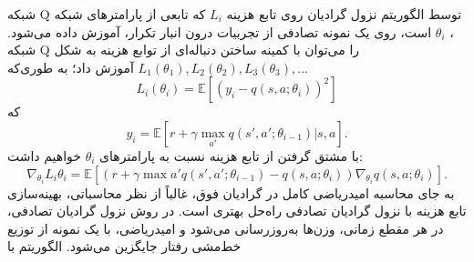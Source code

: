  شبکه Q توسط الگوریتم نزول گرادیان روی تابع هزینه 
$L_i$
که تابعی از پارامترهای شبکه 
،
$\theta_i$
 است، روی یک نمونه تصادفی از تجربیات درون انبار تکرار، آموزش داده می‌شود.
شبکه Q را می‌توان با کمینه ساختن دنباله‌ای از توابع هزینه به شکل 
$L_1(\theta_1), L_2(\theta_2), L_3(\theta_3), ... $ آموزش داد؛ به طوری‌که
$$L_i(\theta_i)=\mathbb{E}\left[(y_i - q(s,a;\theta_i))^2\right]$$  که  $$y_i = \mathbb{E}[r + \gamma \max_{a'} q(s',a'; \theta_{i-1})| s,a].$$ با مشتق گرفتن از تابع هزینه نسبت به پارامترهای $\theta_i$  خواهیم داشت: $$\nabla_{\theta_i} L_i{\theta_i} = \mathbb{E}\left[ \left(r + \gamma \max{a'} q(s',a';\theta_{i-1}) - q(s,a;\theta_i)\right) \nabla_{\theta_i} q(s,a;\theta_i)\right].$$
به جای محاسبه امیدریاضی کامل در گرادیان فوق، غالباً از نظر محاسباتی، بهینه‌سازی تابع هزینه با نزول گرادیان تصادفی   راه‌حل بهتری است.  در روش نزول گرادیان تصادفی، در هر مقطع زمانی، وزن‌ها به‌روزرسانی می‌شود و امیدریاضی، با یک نمونه از توزیع خط‌مشی رفتار  جایگزین می‌شود.
{الگوریتم  با }

